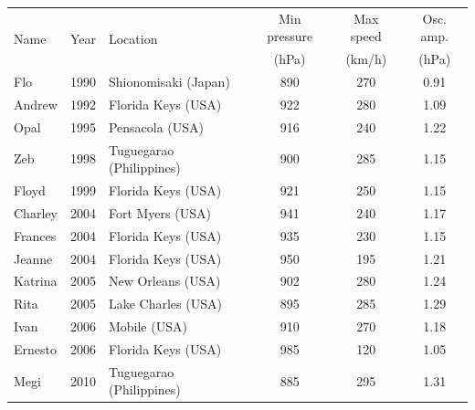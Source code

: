 \begin{table}
	\centering
	\begin{tabular}{ l  c  l  c  c  c }
		\hline
		\multirow{2}{*}{Name} & \multirow{2}{*}{Year} & \multirow{2}{*}{Location} & Min pressure & Max speed & Osc. amp. \\
		& & & (hPa) & (km/h) & (hPa) \\ 
		\hline \hline
		Flo     &  1990 & Shionomisaki (Japan)  & 890 & 270  & 0.91\\
		
		Andrew  &  1992 & Florida Keys (USA) & 922 & 280 & 1.09  \\

		Opal    &  1995 & Pensacola (USA) & 916 & 240 & 1.22\\
		
		Zeb	    &  1998 & Tuguegarao (Philippines)  & 900 & 285 & 1.15\\

		Floyd   &  1999 & Florida Keys (USA) & 921 & 250 & 1.15\\
		
		Charley &  2004 & Fort Myers (USA) & 941 & 240 & 1.17 \\
		
		Frances &  2004 & Florida Keys (USA) & 935 & 230 & 1.15 \\
		
		Jeanne  &  2004 & Florida Keys (USA) & 950 & 195 & 1.21 \\
		
		Katrina &  2005 & New Orleans (USA) & 902 & 280 & 1.24   \\
		
		Rita    &  2005 & Lake Charles (USA)  & 895 & 285 & 1.29  \\
		
		Ivan    &  2006 & Mobile (USA) & 910 & 270 & 1.18\\
		
		Ernesto &  2006 & Florida Keys (USA)  & 985 & 120 & 1.05\\
				
		Megi    &  2010 & Tuguegarao (Philippines) & 885 & 295 & 1.31  \\
		

\end{tabular}
\end{table}
